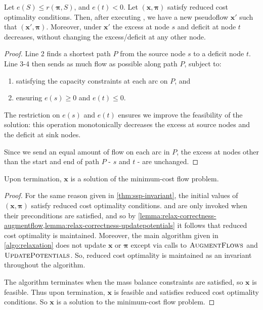 \begin{lemma} \label{lemma:relax-correctness-augmentflow}
Let $e(S) \leq r(\boldsymbol{\pi},S)$, and $e(t) < 0$. Let $\left(\mathbf{x},\boldsymbol{\pi}\right)$ satisfy reduced cost optimality conditions. Then, after executing , we have a new pseudoflow $\mathbf{x}'$ such that $\left(\mathbf{x}',\boldsymbol{\pi}\right)$. Moreover, under $\mathbf{x}'$ the excess at node $s$ and deficit at node $t$ decreases, without changing the excess/deficit at any other node\footnotemark.
\end{lemma}
\begin{proof}
Line 2 finds a shortest path $P$ from the source node $s$ to a deficit node $t$. Line 3-4 then sends as much flow as possible along path $P$, subject to:
\begin{enumerate}
    \item satisfying the capacity constraints at each arc on $P$, and
    \item ensuring $e(s) \geq 0$ and $e(t) \leq 0$\footnotemark.
\end{enumerate}
The restriction on $e(s)$ and $e(t)$ ensures we improve the feasibility of the solution: this operation monotonically decreases the excess at source nodes and the deficit at sink nodes\footnotemark.

Since we send an equal amount of flow on each arc in $P$, the excess at nodes other than the start and end of path $P$ - $s$ and $t$ - are unchanged.
\end{proof}

\begin{thm}[Correctness] \label{thm:relax-correctness}
Upon termination, $\mathbf{x}$ is a solution of the minimum-cost flow problem.
\end{thm}
\begin{proof}
For the same reason given in \cref{thm:ssp-invariant}, the initial values of $\left(\mathbf{x},\boldsymbol{\pi}\right)$ satisfy reduced cost optimality conditions.  and  are only invoked when their preconditions are satisfied, and so by \cref{lemma:relax-correctness-augmentflow,lemma:relax-correctness-updatepotentials} it follows that reduced cost optimality is maintained. Moreover, the main algorithm given in \cref{algo:relaxation} does not update $\mathbf{x}$ or $\boldsymbol{\pi}$ except via calls to $\textproc{AugmentFlows}$ and $\textproc{UpdatePotentials}$. So, reduced cost optimality is maintained as an invariant throughout the algorithm.

The algorithm terminates when the mass balance constraints are satisfied, so $\mathbf{x}$ is feasible. Thus upon termination, $\mathbf{x}$ is feasible and satisfies reduced cost optimality conditions. So $\mathbf{x}$ is a solution to the minimum-cost flow problem. 
\end{proof}

